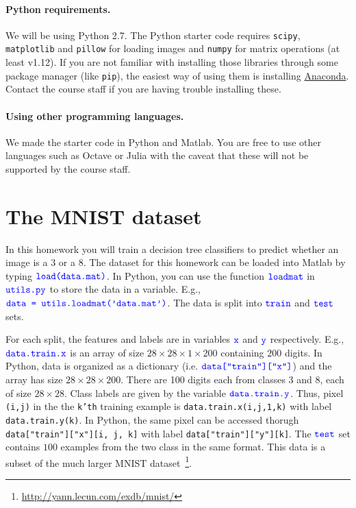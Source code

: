 \documentclass[10pt,letterpaper]{article}
\newcommand{\cmd}[1] {{\color{blue}\texttt{#1}}}
\begin{document}
\paragraph{Python requirements.} We will be using Python 2.7. The Python starter code requires \cmd{scipy}, \cmd{matplotlib} and \cmd{pillow} for loading images and \cmd{numpy} for matrix operations (at least v1.12). 
If you are not familiar with installing those libraries through some package manager (like \cmd{pip}), the easiest way of using them is installing \href{https://conda.io/docs/user-guide/install/index.html}{Anaconda}. Contact the course staff if you are having trouble installing these.

\paragraph{Using other programming languages.} We made the starter code in Python and Matlab. You are free to use other languages such as Octave or Julia with the caveat that these will not be supported by the course staff.

\newpage

\section*{The MNIST dataset}
In this homework you will train a decision tree classifiers to predict whether an image is a $3$ or a $8$. The dataset for this homework can be loaded into Matlab by typing $\cmd{load(data.mat)}$. In Python, you can use the function $\cmd{loadmat}$ in $\cmd{utils.py}$ to store the data in a variable. E.g., $\cmd{data = utils.loadmat('data.mat')}$. The data is split into $\cmd{train}$ and $\cmd{test}$ sets.

For each split, the features and labels are in variables $\cmd{x}$ and $\cmd{y}$ respectively. E.g., $\cmd{data.train.x}$ is an array of size $28 \times 28 \times 1 \times200$ containing $200$ digits.
In Python, data is organized as a dictionary (i.e. $\cmd{data["train"]["x"]}$) and the array has size $28 \times 28 \times 200$. There are 100 digits each from classes ${3}$ and ${8}$, each of size $28 \times 28$. 
Class labels are given by the variable $\cmd{data.train.y}$. Thus, pixel \cmd{(i,j)} in the the \cmd{k'th} training example is \cmd{data.train.x(i,j,1,k)} with label \cmd{data.train.y(k)}. In Python, the same pixel can be accessed thorugh \cmd{data["train"]["x"][i, j, k]} with label \cmd{data["train"]["y"][k]}. The $\cmd{test}$ set contains $100$ examples from the two class in the same format. This data is a subset of the much larger MNIST dataset~\footnote{\url{http://yann.lecun.com/exdb/mnist/}}.
\end{document}
